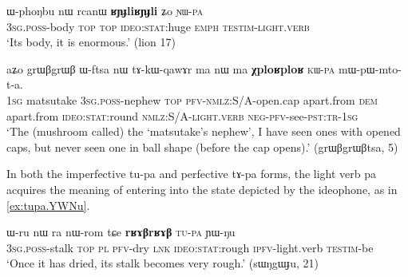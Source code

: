 \documentclass[oldfontcommands,oneside,a4paper,11pt]{article}
\newcommand{\ipa}[1]{{\phon \mbox{#1}}} %
\begin{document}
\begin{exe}
\ex \label{ex:RYJli.Zo.YWpa}
\gll 
\ipa{ɯ-phoŋbu}  	\ipa{nɯ}  	\ipa{rcanɯ}  	\ipa{\textbf{ʁɲɟliʁɲɟli}}  	\ipa{ʑo}  	\textsc{\ipa{ɲɯ-pa} }  \\
\textsc{3sg.poss}-body \textsc{top} \textsc{top} \textsc{ideo:stat}:huge \textsc{emph} \textsc{testim}-\textsc{light.verb} \\
\glt  `Its body, it is enormous.' (lion 17)
\end{exe}
\begin{exe}
\ex \label{ex:XploR.kWpa}
\gll
\ipa{aʑo}  	\ipa{grɯβgrɯβ}  	\ipa{ɯ-ftsa}  	\ipa{nɯ}  	\ipa{tɤ-kɯ-qawɤr}  	\ipa{ma}  	\ipa{nɯ}  	\ipa{ma}  	\ipa{\textbf{χploʁploʁ}}  	\textsc{\ipa{kɯ-pa}}  	\ipa{mɯ-pɯ-mto-t-a.}  	\\
\textsc{1sg} matsutake \textsc{3sg.poss}-nephew \textsc{top} \textsc{pfv-nmlz}:S/A-open.cap apart.from \textsc{dem} apart.from \textsc{ideo:stat}:round \textsc{nmlz:S/A}-\textsc{light.verb} \textsc{neg-pfv}-see-\textsc{pst:tr-1sg} \\
\glt `The (mushroom called) the `matsutake's nephew', I have seen ones with opened caps, but never seen one in ball shape (before the cap opens).' (grɯβgrɯβtsa, 5)
\end{exe}

In both the imperfective \ipa{tu-pa} and perfective \ipa{tɤ-pa} forms, the light verb \ipa{pa} acquires the meaning of entering into the state depicted by the ideophone, as in \ref{ex:tupa.YWNu}.
\begin{exe}
\ex \label{ex:tupa.YWNu}
\gll
\ipa{ɯ-ru}  	\ipa{nɯ} \ipa{ra}  	\ipa{nɯ-rom}  	\ipa{tɕe}  	\ipa{\textbf{rʁɤβrʁɤβ}}  	\textsc{\ipa{tu-pa}}  	\ipa{ɲɯ-ŋu}  \\
\textsc{3sg.poss}-stalk \textsc{top} \textsc{pl} \textsc{pfv}-dry \textsc{lnk} \textsc{ideo:stat}:rough \textsc{ipfv}-light.verb \textsc{testim}-be \\
\glt `Once it has dried, its stalk becomes very rough.' (sɯŋgɯɟu, 21)
\end{exe}
\end{document}
